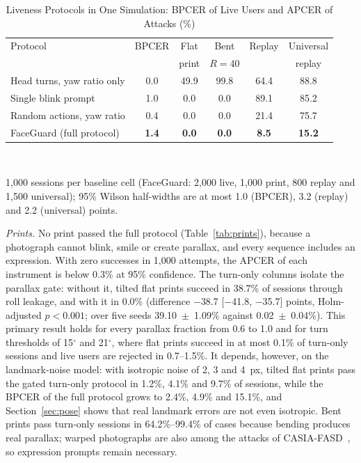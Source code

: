 \documentclass{ieeeaccess}
\begin{document}
\begin{table}[!t]
\centering
\caption{Liveness Protocols in One Simulation: BPCER of Live Users and APCER of Attacks (\%)}
\label{tab:baselines}
\footnotesize
\setlength{\tabcolsep}{2.4pt}
\begin{tabular}{@{}lccccc@{}}
\toprule
Protocol & BPCER & Flat & Bent & Replay & Universal \\
 & & print & $R{=}40$ & & replay \\
\midrule
Head turns, yaw ratio only & 0.0 & 49.9 & 99.8 & 64.4 & 88.8 \\
Single blink prompt & 1.0 & 0.0 & 0.0 & 89.1 & 85.2 \\
Random actions, yaw ratio & 0.4 & 0.0 & 0.0 & 21.4 & 75.7 \\
FaceGuard (full protocol) & \textbf{1.4} & \textbf{0.0} & \textbf{0.0} & \textbf{8.5} & \textbf{15.2} \\

\bottomrule
\end{tabular}\\[2pt]
\raggedright\scriptsize 1,000 sessions per baseline cell (FaceGuard: 2,000 live, 1,000 print, 800 replay and 1,500 universal); 95\% Wilson half-widths are at most 1.0 (BPCER), 3.2 (replay) and 2.2 (universal) points.
\end{table}

\emph{Prints.} No print passed the full protocol (Table~\ref{tab:prints}), because a photograph cannot blink, smile or create parallax, and every sequence includes an expression. With zero successes in 1,000 attempts, the APCER of each instrument is below 0.3\% at 95\% confidence. The turn-only columns isolate the parallax gate: without it, tilted flat prints succeed in 38.7\% of sessions through roll leakage, and with it in 0.0\% (difference $-$38.7 [$-$41.8, $-$35.7] points, Holm-adjusted $p<0.001$; over five seeds 39.10~$\pm$~1.09\% against 0.02~$\pm$~0.04\%). This primary result holds for every parallax fraction from 0.6 to 1.0 and for turn thresholds of 15$^\circ$ and 21$^\circ$, where flat prints succeed in at most 0.1\% of turn-only sessions and live users are rejected in 0.7--1.5\%. It depends, however, on the landmark-noise model: with isotropic noise of 2, 3 and 4~px, tilted flat prints pass the gated turn-only protocol in 1.2\%, 4.1\% and 9.7\% of sessions, while the BPCER of the full protocol grows to 2.4\%, 4.9\% and 15.1\%, and Section~\ref{sec:pose} shows that real landmark errors are not even isotropic. Bent prints pass turn-only sessions in 64.2\%--99.4\% of cases because bending produces real parallax; warped photographs are also among the attacks of CASIA-FASD~\cite{zhang2012casiafasd}, so expression prompts remain necessary.
\end{document}
